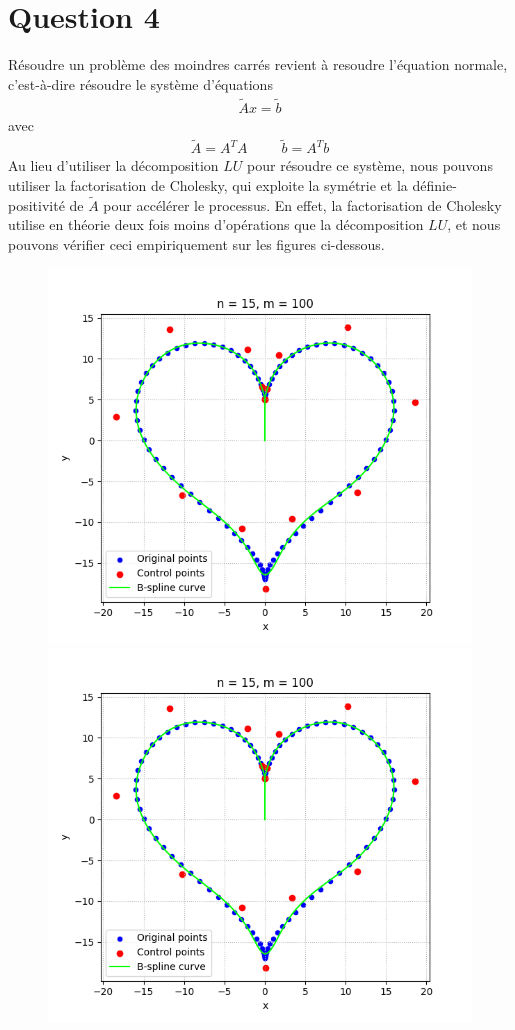 \documentclass[11pt]{article}
\begin{document}
\section*{Question 4}
Résoudre un problème des moindres carrés revient à resoudre l'équation normale, c'est-à-dire résoudre le système d'équations
\begin{align}
    \tilde{A}x = \tilde{b}
\end{align}
avec
\begin{align}
    \tilde{A} = A^TA ~~~~~~~~~~~ \tilde{b} = A^Tb
\end{align}
Au lieu d'utiliser la décomposition $LU$ pour résoudre ce système, nous pouvons utiliser la factorisation de Cholesky, qui exploite la symétrie et la définie-positivité de $\tilde{A}$ pour accélérer le processus. En effet, la factorisation de Cholesky utilise en théorie deux fois moins d'opérations que la décomposition $LU$, et nous pouvons vérifier ceci empiriquement sur les figures ci-dessous.
\begin{figure}[H]
    \centering
    \includegraphics[scale=0.5]{../../Devoir1/rapport/images/coeur1.png}
    \includegraphics[scale=0.5]{../../Devoir1/rapport/images/coeur1.png}
\end{figure}
\end{document}
